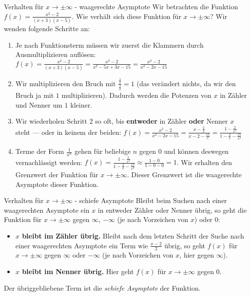 \begin{bla}{Verhalten für $x \rightarrow \pm \infty$ - waagerechte Asymptote}
  Wir betrachten die Funktion $f(x)=\frac{x^2-2}{(x+3)(x-5)}$. Wie verhält sich diese Funktion für $x \rightarrow \pm \infty$?
  Wir wenden folgende Schritte an:
  \begin{enumerate}
    \item Je nach Funktionsterm müssen wir zuerst die Klammern durch Ausmultiplizieren auflösen: $f(x)=\frac{x^2-2}{(x+3)(x-5)}=\frac{x^2-2}{x^2-5x+3x-15}=\frac{x^2-2}{x^2-2x-15}$
    \item Wir multiplizieren den Bruch mit $\frac{\tfrac{1}{x}}{\tfrac{1}{x}}=1$ (das verändert nichts, da wir den Bruch ja mit $1$ multiplizieren). Dadurch werden die Potenzen von $x$ in Zähler und Nenner um $1$ kleiner.
    \item Wir wiederholen Schritt 2 so oft, bis \textbf{entweder} in Zähler \textbf{oder} Nenner $x$ steht --- oder in keinem der beiden: $f(x)=\frac{x^2-2}{x^2-2x-15}=\frac{x-\tfrac{2}{x}}{x-2-\tfrac{15}{x}}=\frac{1-\tfrac{2}{x^2}}{1-\tfrac{2}{x}-\tfrac{15}{x^2}}$
    \item Terme der Form $\frac{1}{x^n}$ gehen für beliebige $n$ gegen $0$ und können deswegen vernachlässigt werden: $f(x)=\frac{1-\tfrac{2}{x^2}}{1-\tfrac{2}{x}-\tfrac{15}{x^2}} \approx \frac{1-0}{1-0-0}=1$. Wir erhalten den Grenzwert der Funktion für $x \rightarrow \pm \infty$. Dieser Grenzwert ist die waagerechte Asymptote dieser Funktion.
  \end{enumerate}
\end{bla}

\begin{bla}{Verhalten für $x \rightarrow \pm \infty$ - schiefe Asymptote}
  Bleibt beim Suchen nach einer waagerechten Asymptote ein $x$ in entweder Zähler oder Nenner übrig, so geht die Funktion für $x \rightarrow \pm \infty$ gegen $\infty$, $-\infty$ (je nach Vorzeichen von $x$) oder $0$:
  \begin{itemize}
    \item \textbf{$x$ bleibt im Zähler übrig.} Bleibt nach dem letzten Schritt der Suche nach einer waagerechten Asymptote ein Term wie $\frac{x-2}{2}$ übrig, so geht $f(x)$ für $x \rightarrow \pm \infty$ gegen $\infty$ oder $-\infty$ (je nach Vorzeichen von $x$, hier gegen $\infty$).
    \item \textbf{$x$ bleibt im Nenner übrig.} Hier geht $f(x)$ für $x \rightarrow \pm \infty$ gegen $0$.
  \end{itemize}
  Der übriggebliebene Term ist die \emph{schiefe Asymptote} der Funktion.
\end{bla}


